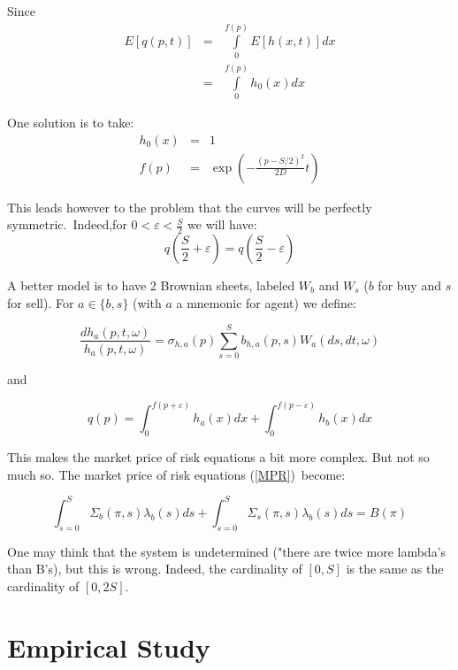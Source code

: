 \documentclass{article}
\begin{document}
Since%
\begin{eqnarray*}
E[q(p,t)] &=&\int\limits_{0}^{f(p)}E[h(x,t)]dx \\
&=&\int\limits_{0}^{f(p)}h_{0}(x)dx
\end{eqnarray*}

One solution is to take:%
\begin{eqnarray*}
h_{0}(x) &=&1 \\
f(p) &=&\exp (-\frac{(p-S/2)^{2}}{2D}t)
\end{eqnarray*}

This leads however to the problem that the curves will be perfectly
symmetric.\ Indeed,for $0<\varepsilon <\frac{S}{2}$ we will have:%
\begin{equation*}
q(\frac{S}{2}+\varepsilon )=q(\frac{S}{2}-\varepsilon )
\end{equation*}

A better model is to have 2 Brownian sheets, labeled $W_{b}$ and $W_{s}$ ($b$
for buy and $s$ for sell). For $a\in \{b,s\}$ (with $a$ a mnemonic for
agent) we define:

\begin{equation*}
\frac{dh_{a}(p,t,\omega )}{h_{a}(p,t,\omega )}=\sigma
_{h,a}(p)\sum_{s=0}^{S}b_{h,a}(p,s)W_{a}(ds,dt,\omega )
\end{equation*}

and

\begin{equation*}
q(p)=\int_{0}^{f(p+\varepsilon )}h_{a}(x)dx+\int_{0}^{f(p-\varepsilon
)}h_{b}(x)dx
\end{equation*}

This makes the market price of risk equations a bit more complex. But not so
much so. The market price of risk equations (\ref{MPR})\ become:

\begin{equation*}
\int_{s=0}^{S}\Sigma _{b}(\pi ,s)\lambda _{b}(s)ds+\int_{s=0}^{S}\Sigma
_{s}(\pi ,s)\lambda _{b}(s)ds=B(\pi )
\end{equation*}

One may think that the system is undetermined ("there are twice more
lambda's than B's), but this is wrong. Indeed, the cardinality of $[0,S]$ is
the same as the cardinality of $[0,2S].$

\pagebreak

\section{Empirical Study}
\end{document}
